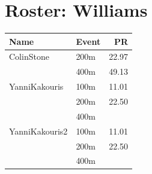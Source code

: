 \documentclass[11pt]{article}
\begin{document}
\section*{Roster: Williams}
\begin{tabularx}{\textwidth}{lXr}
\toprule
\textbf{Name} & \textbf{Event} & \textbf{PR} \\
\midrule
ColinStone & 200m & 22.97 \\
& 400m & 49.13 \\
\midrule
YanniKakouris & 100m & 11.01 \\
& 200m & 22.50 \\
& 400m &  \\
\midrule
YanniKakouris2 & 100m & 11.01 \\
& 200m & 22.50 \\
& 400m &  \\
\midrule
\bottomrule
\end{tabularx}
\end{document}
